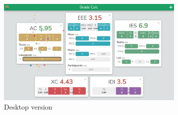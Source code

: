 \vfill
\begin{figure}[ht!]
    \begin{subfigure}[b]{0.757\textwidth-0.1cm}
        \centering
        \includegraphics[width=\textwidth]{media/screenshots/screenshot-confetti-pc.png}
        \caption{Desktop version}
    \end{subfigure}
    \hfill
    \begin{subfigure}[b]{0.243\textwidth-0.1cm}
        \centering

\end{subfigure}
\end{figure}
